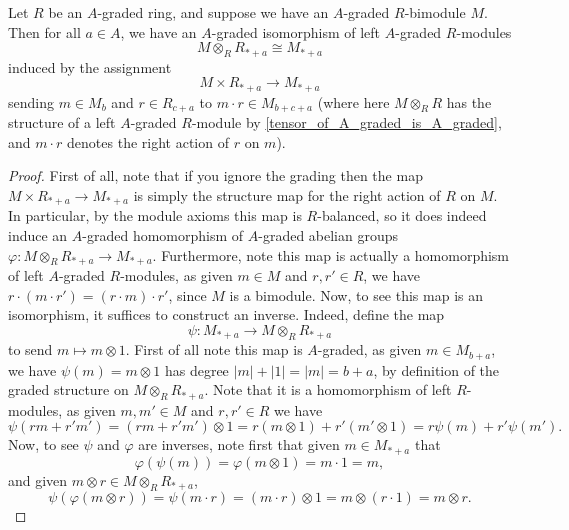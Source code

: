 \documentclass[../main.tex]{subfiles}
\begin{document}
\begin{lemma}\label{tensor_shift_A_graded}
	Let $R$ be an $A$-graded ring, and suppose we have an $A$-graded $R$-bimodule $M$. Then for all $a\in A$, we have an $A$-graded isomorphism of left $A$-graded $R$-modules
	\[M\otimes_R R_{*+a}\cong M_{*+a}\]
	induced by the assignment
	\[M\times R_{*+a}\to M_{*+a}\]
	sending $m\in M_b$ and $r\in R_{c+a}$ to $m\cdot r\in M_{b+c+a}$ (where here $M\otimes_RR$ has the structure of a left $A$-graded $R$-module by \autoref{tensor_of_A_graded_is_A_graded}, and $m\cdot r$ denotes the right action of $r$ on $m$).
\end{lemma}
\begin{proof}
	First of all, note that if you ignore the grading then the map $M\times R_{*+a}\to M_{*+a}$ is simply the structure map for the right action of $R$ on $M$. In particular, by the module axioms this map is $R$-balanced, so it does indeed induce an $A$-graded homomorphism of $A$-graded abelian groups $\varphi:M\otimes_RR_{*+a}\to M_{*+a}$. Furthermore, note this map is actually a homomorphism of left $A$-graded $R$-modules, as given $m\in M$ and $r,r'\in R$, we have $r\cdot(m\cdot r')=(r\cdot m)\cdot r'$, since $M$ is a bimodule. Now, to see this map is an isomorphism, it suffices to construct an inverse. Indeed, define the map
	\[\psi:M_{*+a}\to M\otimes_RR_{*+a}\]
	to send $m\mapsto m\otimes 1$. First of all note this map is $A$-graded, as given $m\in M_{b+a}$, we have $\psi(m)=m\otimes 1$ has degree $|m|+|1|=|m|=b+a$, by definition of the graded structure on $M\otimes_RR_{*+a}$. Note that it is a homomorphism of left $R$-modules, as given $m,m'\in M$ and $r,r'\in R$ we have
	\[\psi(rm+r'm')=(rm+r'm')\otimes 1=r(m\otimes1)+r'(m'\otimes1)=r\psi(m)+r'\psi(m').\]
	Now, to see $\psi$ and $\varphi$ are inverses, note first that given $m\in M_{*+a}$ that
	\[\varphi(\psi(m))=\varphi(m\otimes 1)=m\cdot1=m,\]
	and given $m\otimes r\in M\otimes_RR_{*+a}$, 
	\[\psi(\varphi(m\otimes r))=\psi(m\cdot r)=(m\cdot r)\otimes 1=m\otimes(r\cdot 1)=m\otimes r.\]
\end{proof}
\end{document}
